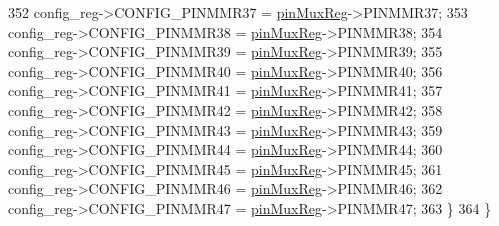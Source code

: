 \begin{DoxyCode}
352         config\_reg->CONFIG\_PINMMR37 = \mbox{\hyperlink{reg__pinmux_8h_a489be2306394971fc7586946f88d6380}{pinMuxReg}}->PINMMR37;
353         config\_reg->CONFIG\_PINMMR38 = \mbox{\hyperlink{reg__pinmux_8h_a489be2306394971fc7586946f88d6380}{pinMuxReg}}->PINMMR38;
354         config\_reg->CONFIG\_PINMMR39 = \mbox{\hyperlink{reg__pinmux_8h_a489be2306394971fc7586946f88d6380}{pinMuxReg}}->PINMMR39;
355         config\_reg->CONFIG\_PINMMR40 = \mbox{\hyperlink{reg__pinmux_8h_a489be2306394971fc7586946f88d6380}{pinMuxReg}}->PINMMR40;
356         config\_reg->CONFIG\_PINMMR41 = \mbox{\hyperlink{reg__pinmux_8h_a489be2306394971fc7586946f88d6380}{pinMuxReg}}->PINMMR41;
357         config\_reg->CONFIG\_PINMMR42 = \mbox{\hyperlink{reg__pinmux_8h_a489be2306394971fc7586946f88d6380}{pinMuxReg}}->PINMMR42;
358         config\_reg->CONFIG\_PINMMR43 = \mbox{\hyperlink{reg__pinmux_8h_a489be2306394971fc7586946f88d6380}{pinMuxReg}}->PINMMR43;
359         config\_reg->CONFIG\_PINMMR44 = \mbox{\hyperlink{reg__pinmux_8h_a489be2306394971fc7586946f88d6380}{pinMuxReg}}->PINMMR44;
360         config\_reg->CONFIG\_PINMMR45 = \mbox{\hyperlink{reg__pinmux_8h_a489be2306394971fc7586946f88d6380}{pinMuxReg}}->PINMMR45;
361         config\_reg->CONFIG\_PINMMR46 = \mbox{\hyperlink{reg__pinmux_8h_a489be2306394971fc7586946f88d6380}{pinMuxReg}}->PINMMR46;
362         config\_reg->CONFIG\_PINMMR47 = \mbox{\hyperlink{reg__pinmux_8h_a489be2306394971fc7586946f88d6380}{pinMuxReg}}->PINMMR47;
363     \}
364 \}
\end{DoxyCode}
